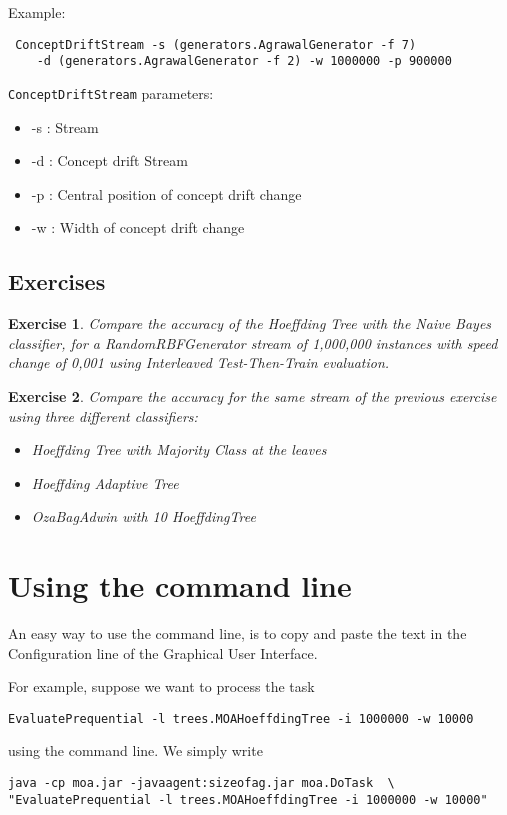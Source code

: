 \documentclass[a4paper,12pt]{article}
\newtheorem{exercise}{Exercise}{}
\begin{document}
Example:
\begin{footnotesize}\begin{verbatim}
 ConceptDriftStream -s (generators.AgrawalGenerator -f 7) 
    -d (generators.AgrawalGenerator -f 2) -w 1000000 -p 900000 
\end{verbatim}\end{footnotesize}
\texttt{ConceptDriftStream} parameters:

\begin{itemize}
\item -s : Stream 
\item -d : Concept drift Stream
\item -p : Central position of concept drift change
\item -w : Width of concept drift change\end{itemize}


\subsection{Exercises}

\begin{exercise}Compare the accuracy of the Hoeffding Tree with the Naive Bayes classifier, for a RandomRBFGenerator stream of 1,000,000 instances with speed change of 0,001 using Interleaved Test-Then-Train evaluation.  
\end{exercise}
\begin{exercise}Compare the accuracy for the same stream of the previous exercise using three different classifiers:
\begin{itemize}
 \item Hoeffding Tree with Majority Class at the leaves
 \item Hoeffding Adaptive Tree
 \item OzaBagAdwin with 10 HoeffdingTree

\end{itemize}
\end{exercise}


\section{Using the command line}

An easy way to use the command line, is to copy and paste the text in the Configuration line of the Graphical User Interface.%

For example, suppose we want to process the task 
\begin{verbatim}EvaluatePrequential -l trees.MOAHoeffdingTree -i 1000000 -w 10000\end{verbatim}
using the command line. We simply write 
\begin{verbatim}
java -cp moa.jar -javaagent:sizeofag.jar moa.DoTask  \
"EvaluatePrequential -l trees.MOAHoeffdingTree -i 1000000 -w 10000"
\end{verbatim}
\end{document}
